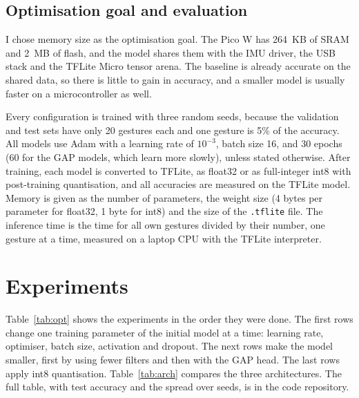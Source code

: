 \documentclass[conference]{IEEEtran}
\begin{document}
\subsection{Optimisation goal and evaluation}
I chose memory size as the optimisation goal. The Pico W has 264~KB of SRAM
and 2~MB of flash, and the model shares them with the IMU driver, the USB
stack and the TFLite Micro tensor arena. The baseline is already accurate on
the shared data, so there is little to gain in accuracy, and a smaller model
is usually faster on a microcontroller as well.

Every configuration is trained with three random seeds, because the
validation and test sets have only 20 gestures each and one gesture is
5\% of the accuracy. All models use Adam with a learning rate of
$10^{-3}$, batch size 16, and 30 epochs (60 for the GAP models, which learn
more slowly), unless stated otherwise. After training, each model is
converted to TFLite, as float32 or as full-integer int8 with post-training
quantisation, and all accuracies are measured on the TFLite model. Memory is
given as the number of parameters, the weight size (4 bytes per parameter
for float32, 1 byte for int8) and the size of the \texttt{.tflite} file.
The inference time is the time for all own gestures divided by their
number, one gesture at a time, measured on a laptop CPU with the TFLite
interpreter.

\section{Experiments}

Table~\ref{tab:opt} shows the experiments in the order they were done. The
first rows change one training parameter of the initial model at a time:
learning rate, optimiser, batch size, activation and dropout. The next rows
make the model smaller, first by using fewer filters and then with the GAP
head. The last rows apply int8 quantisation. Table~\ref{tab:arch} compares
the three architectures. The full table, with test accuracy and the spread
over seeds, is in the code repository.
\end{document}
